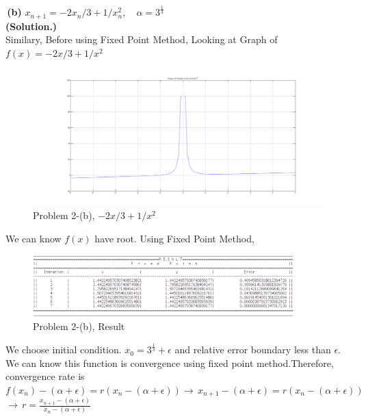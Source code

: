 \documentclass[10pt]{article}
\begin{document}
\begin{flushleft}
	\;\;\;\;\newpage
	\quad\,\textbf{(b)} $x_{n+1}=-2x_n/3+1/x_n^2,\quad \alpha=3^{\frac{1}{3}}$\\
	\;\;\;
	\qquad \quad \textbf{(Solution.)} \\
	\qquad \quad Similary, Before using Fixed Point Method, Looking at Graph of $f(x)=-2x/3+1/x^2$\\
	\begin{figure}[!h]
		\centering
		\begin{center}
		\includegraphics[width=1\textwidth]{2-b.png}
		\caption{Problem 2-(b), $-2x/3+1/x^2$ }
		\end{center}
	\end{figure}
	\qquad \quad We can know $f(x)$ have root. Using Fixed Point Method, \\
	\begin{figure}[!h]
		\centering
		\begin{center}
		\includegraphics[width=0.9\textwidth]{2-rb.png}
		\caption{Problem 2-(b), Result}
		\end{center}
	\end{figure}
	\qquad \quad We choose initial condition. $x_0=3^{\frac{1}{3}}+\epsilon$ and relative error boundary less than $\epsilon$.\\
	\qquad \quad We can know this function is convergence using fixed point method.Therefore, convergence rate is\\
	\;\;\;
	\qquad \qquad \qquad \qquad\quad$f(x_n)-(\alpha+\epsilon)=r(x_n-(\alpha+\epsilon)) \rightarrow \, x_{n+1}-(\alpha+\epsilon)=r(x_n-(\alpha+\epsilon))$\\
	\qquad\qquad\qquad\qquad\qquad\qquad\qquad\qquad\qquad\qquad\qquad\qquad$\rightarrow \, r=\frac{x_{n+1}-(\alpha+\epsilon)}{x_n-(\alpha+\epsilon)}$\\

\end{flushleft}
\end{document}
